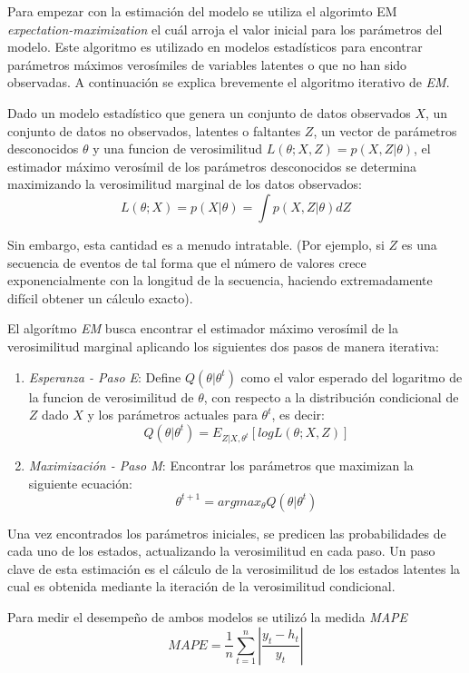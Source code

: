 {Para empezar con la estimación del modelo se utiliza el algorimto EM \emph{expectation-maximization} el cuál arroja el valor inicial para los parámetros del modelo. Este algoritmo es utilizado en modelos estadísticos para encontrar parámetros máximos verosímiles de variables latentes o que no han sido observadas. A continuación se explica brevemente el algoritmo iterativo de \emph{EM}.

Dado un modelo estadístico que genera un conjunto de datos observados $X$, un conjunto de datos no observados, latentes o faltantes $Z$, un vector de parámetros desconocidos $\theta$ y una funcion de verosimilitud $L(\theta;X,Z) = p(X,Z|\theta)$, el estimador máximo verosímil de los parámetros desconocidos se determina maximizando la verosimilitud marginal de los datos observados: $$L(\theta;X) = p(X|\theta) = \int p(X,Z|\theta)dZ$$

Sin embargo, esta cantidad es a menudo intratable. (Por ejemplo, si $Z$ es una secuencia de eventos de tal forma que el número de valores crece exponencialmente con la longitud de la secuencia, haciendo extremadamente difícil obtener un cálculo exacto).

El algorítmo \emph{EM} busca encontrar el estimador máximo verosímil de la verosimilitud marginal aplicando los siguientes dos pasos de manera iterativa:

\begin{enumerate}
  \item \emph{Esperanza - Paso E}: Define $Q(\theta|\theta^t)$ como el valor esperado del logaritmo de la funcion de verosimilitud de $\theta$, con respecto a la distribución condicional de $Z$ dado $X$ y los parámetros actuales para $\theta^t$, es decir: $$Q(\theta|\theta^t) = E_{Z|X,\theta^t}[log L(\theta;X,Z)]$$
  \item \emph{Maximización - Paso M}: Encontrar los parámetros que maximizan la siguiente ecuación: $$\theta^{t+1} = argmax_\theta Q(\theta|\theta^t)$$
\end{enumerate}


Una vez encontrados los parámetros iniciales, se predicen las probabilidades de cada uno de los estados, actualizando la verosimilitud en cada paso. Un paso clave de esta estimación es el cálculo de la verosimilitud de los estados latentes la cual es obtenida mediante la iteración de la verosimilitud condicional.

Para medir el desempeño de ambos modelos se utilizó la medida \emph{MAPE} $$MAPE=\frac{1}{n}\sum_{t=1}^{n}|\frac{y_t-h_t}{y_t}|$$ 

}
